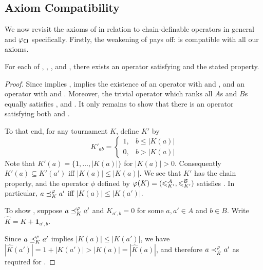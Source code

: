 \subsection{Axiom Compatibility}

We now revisit the axioms of  in relation to
chain-definable operators in general and ${\varphi_{\mathsf{CI}}}$ specifically. Firstly,
the weakening of \chainmin{} pays off: \chaindef{} is
compatible with all our axioms.

\begin{theorem}
    \label{tourn_result_chaindef_axiom_compatibilities}

    For each of \anon{}, \dualaxiom{}, \iim{},
    \mon{} and \posresp{}, there exists an operator satisfying
    \chaindef{} and the stated property.

\end{theorem}

\begin{proof}

    Since \chainmin{} implies \chaindef{},
     implies the existence of an
    operator with \chaindef{} and \dualaxiom{}, and an operator
    with \chaindef{} and \mon{}.  Moreover, the trivial
    operator which ranks all $A$s and $B$s equally satisfies
    \chaindef{}, \anon{}
    and \iim{}. It only remains to show that there is an operator
    satisfying both \chaindef{} and \posresp{}.

    To that end, for any tournament $K$, define $K'$ by
    \[
        K'_{ab} = \begin{cases}
            1 ,& b \le |K(a)| \\
            0 ,& b > |K(a)|
        \end{cases}
    \]
    Note that $K'(a) = \{1,\ldots,|K(a)|\}$ for $|K(a)| > 0$. Consequently
    $K'(a) \subseteq K'(a')$ iff $|K(a)| \le |K(a)|$. We see that $K'$ has the
    chain property, and the operator $\phi$ defined by $\varphi(K) =
    ({\leqslant^{\mathcal{A}}_{K'}}, {\leqslant^{\mathcal{B}}_{K'}})$ satisfies \chaindef{}. In
    particular, $a \preceq_K^\varphi a'$ iff $|K(a)| \le |K(a')|$.

    To show \posresp{}, suppose $a \preceq_K^\varphi a'$ and $K_{a',b} = 0$
    for some $a, a' \in A$ and $b \in B$. Write $\hat{K} = K + \bm{1}_{a',b}$.

    Since $a \preceq_K^\varphi a'$ implies $|K(a)| \le |K(a')|$, we have
    $|\hat{K}(a')| = 1 + |K(a')| > |K(a)| = |\hat{K}(a)|$, and therefore $a
    \prec_{\hat{K}}^\varphi a'$ as required for \posresp{}.
\end{proof}


